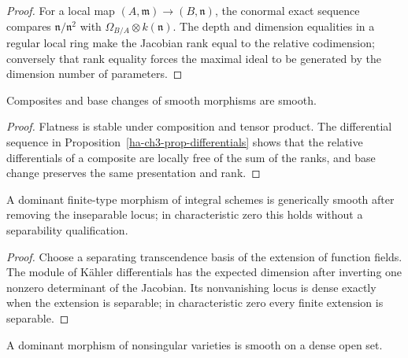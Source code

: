 \begin{proof}

For a local map $(A,\mathfrak m)\to(B,\mathfrak n)$, the conormal exact sequence compares
$\mathfrak n/\mathfrak n^2$ with $\Omega_{B/A}\otimes k(\mathfrak n)$.  The depth and dimension
equalities in a regular local ring make the Jacobian rank equal to the relative codimension; conversely
that rank equality forces the maximal ideal to be generated by the dimension number of parameters.

\end{proof}
\begin{proposition}\label{ha-ch3-prop-smooth-composition}
Composites and base changes of smooth morphisms are smooth.
\end{proposition}
\begin{proof}

Flatness is stable under composition and tensor product.  The differential sequence in
Proposition~\ref{ha-ch3-prop-differentials} shows that the relative differentials of a composite are
locally free of the sum of the ranks, and base change preserves the same presentation and rank.

\end{proof}
\begin{lemma}\label{ha-ch3-lem-generic-separable}
A dominant finite-type morphism of integral schemes is generically smooth
after removing the inseparable locus; in characteristic zero this holds
without a separability qualification.

\end{lemma}
\begin{proof}

Choose a separating transcendence basis of the extension of function fields.  The module of
Kähler differentials has the expected dimension after inverting one nonzero determinant of the
Jacobian.  Its nonvanishing locus is dense exactly when the extension is separable; in characteristic
zero every finite extension is separable.

\end{proof}
\begin{proposition}\label{ha-ch3-prop-smooth-nonsingular}
A dominant morphism of nonsingular varieties is smooth on a dense open set.

\end{proposition}
